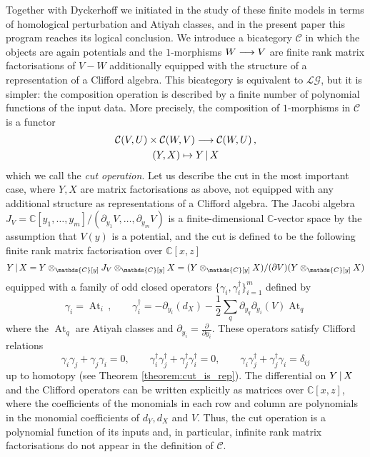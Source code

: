 \documentclass[english,letter paper,12pt,leqno]{article}
\theoremstyle{example}
\numberwithin{equation}{section}
\def\LG{\mathcal{LG}}
\def\be{\begin{equation}}
\def\ee{\end{equation}}
\def\nC{\mathds{C}}
\def\L{\mathcal{C}}
\def\ferm{\gamma}
\def\fermc{\gamma^\dagger}
\DeclareMathOperator{\At}{At}
\begin{document}
Together with Dyckerhoff we initiated in \cite{dm1102.2957} the study of these finite models in terms of homological perturbation and Atiyah classes, and in the present paper this program reaches its logical conclusion. We introduce a bicategory $\L$ in which the objects are again potentials and the $1$-morphisms $W \longrightarrow V$ are finite rank matrix factorisations of $V - W$ additionally equipped with the structure of a representation of a Clifford algebra. This bicategory is equivalent to $\LG$, but it is simpler: the composition operation is described by a finite number of polynomial functions of the input data. More precisely, the composition of $1$-morphisms in $\L$ is a functor
\begin{gather}
\L(V,U) \times \L(W,V) \lto \L(W,U)\,,\label{eq:cut_functor_intro}\\
(Y,X) \mapsto Y \l X
\end{gather}
which we call the \emph{cut operation}. Let us describe the cut in the most important case, where $Y, X$ are matrix factorisations as above, not equipped with any additional structure as representations of a Clifford algebra. The Jacobi algebra $J_V = \nC[y_1,\ldots,y_m]/(\partial_{y_1} V, \ldots, \partial_{y_m} V)$ is a finite-dimensional $\nC$-vector space by the assumption that $V(y)$ is a potential, and the cut is defined to be the following finite rank matrix factorisation over $\nC[x,z]$
\be
Y \l X = Y \otimes_{\nC[y]} J_V \otimes_{\nC[y]} X = ( Y \otimes_{\nC[y]} X ) / (\partial V) (Y \otimes_{\nC[y]} X )
\ee
equipped with a family of odd closed operators $\{\ferm_i, \fermc_i\}_{i=1}^m$ defined by
\begin{equation}\label{eq:intro_clifford_act1_intro}
\ferm_i = \At_i\,, \qquad \fermc_i = - \partial_{y_i}(d_X) - \frac{1}{2} \sum_q \partial_{y_q} \partial_{y_i}(V) \At_{q}
\end{equation}
where the $\At_q$ are Atiyah classes and $\partial_{y_i} = \frac{\partial}{\partial y_i}$. These operators satisfy Clifford relations
\be\label{eq:clifford_relations_intro}
\ferm_i \ferm_j + \ferm_j \ferm_i = 0, \qquad \fermc_i \fermc_j + \fermc_j \fermc_i = 0, \qquad \ferm_i \fermc_j + \fermc_j \ferm_i = \delta_{ij}
\ee
up to homotopy (see Theorem \ref{theorem:cut_is_rep}). The differential on $Y \,|\, X$ and the Clifford operators can be written explicitly as matrices over $\nC[x,z]$, where the coefficients of the monomials in each row and column are polynomials in the monomial coefficients of $d_Y, d_X$ and $V$. Thus, the cut operation is a polynomial function of its inputs and, in particular, infinite rank matrix factorisations do not appear in the definition of $\L$.
\end{document}
